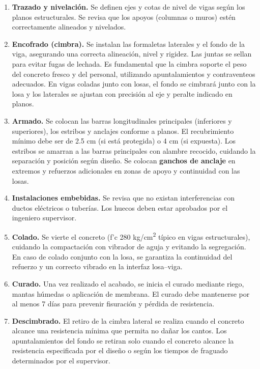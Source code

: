 \documentclass[12pt]{article}
\begin{document}
	\begin{enumerate}[label=\textbf{\arabic*.},leftmargin=1.2cm]
		\item \textbf{Trazado y nivelación.}  
		Se definen ejes y cotas de nivel de vigas según los planos estructurales. Se revisa que los apoyos (columnas o muros) estén correctamente alineados y nivelados.
		
		\item \textbf{Encofrado (cimbra).}  
		Se instalan las formaletas laterales y el fondo de la viga, asegurando una correcta alineación, nivel y rigidez. Las juntas se sellan para evitar fugas de lechada.  
		Es fundamental que la cimbra soporte el peso del concreto fresco y del personal, utilizando apuntalamientos y contraventeos adecuados.  
		En vigas coladas junto con losas, el fondo se cimbrará junto con la losa y los laterales se ajustan con precisión al eje y peralte indicado en planos.
		
		\item \textbf{Armado.}  
		Se colocan las barras longitudinales principales (inferiores y superiores), los estribos y anclajes conforme a planos.  
		El recubrimiento mínimo debe ser de 2.5 cm (si está protegida) o 4 cm (si expuesta).  
		Los estribos se amarran a las barras principales con alambre recocido, cuidando la separación y posición según diseño.  
		Se colocan \textbf{ganchos de anclaje} en extremos y refuerzos adicionales en zonas de apoyo y continuidad con las losas.
		
		\item \textbf{Instalaciones embebidas.}  
		Se revisa que no existan interferencias con ductos eléctricos o tuberías. Los huecos deben estar aprobados por el ingeniero supervisor.
		
		\item \textbf{Colado.}  
		Se vierte el concreto (f’c 280 kg/cm\textsuperscript{2} típico en vigas estructurales), cuidando la compactación con vibrador de aguja y evitando la segregación.  
		En caso de colado conjunto con la losa, se garantiza la continuidad del refuerzo y un correcto vibrado en la interfaz losa–viga.
		
		\item \textbf{Curado.}  
		Una vez realizado el acabado, se inicia el curado mediante riego, mantas húmedas o aplicación de membrana. El curado debe mantenerse por al menos 7 días para prevenir fisuración y pérdida de resistencia.
		
		\item \textbf{Descimbrado.}  
		El retiro de la cimbra lateral se realiza cuando el concreto alcance una resistencia mínima que permita no dañar los cantos.  
		Los apuntalamientos del fondo se retiran solo cuando el concreto alcance la resistencia especificada por el diseño o según los tiempos de fraguado determinados por el supervisor.
	\end{enumerate}
	
\end{document}

